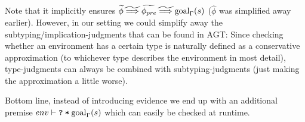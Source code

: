 \documentclass[11pt,a4paper]{article}
\begin{document}
\begin{description}
	Note that it implicitly ensures $\widetilde{\phi} \widetilde{\implies} \widetilde{\phi_{pre}} \widetilde{\implies} \textrm{goal}_{\Gamma}(s)$ ($\hat{\phi}$ was simplified away earlier).
	However, in our setting we could simplify away the subtyping/implication-judgments that can be found in AGT:
	Since checking whether an environment has a certain type is naturally defined as a conservative approximation (to whichever type describes the environment in most detail), type-judgments can always be combined with subtyping-judgments (just making the approximation a little worse).
	
	Bottom line, instead of introducing evidence we end up with an additional premise $env \vdash \texttt{\texttt{?}\:*\:$\textrm{goal}_{\Gamma}(s)$}$ which can easily be checked at runtime.
\end{description}



\end{document}
